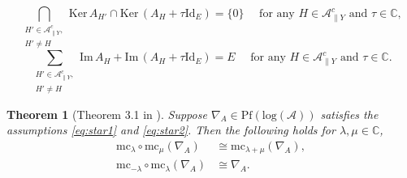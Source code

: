 \documentclass[a4paper,12pt]{article}
\newtheorem{thm}{Theorem}[section]
\theoremstyle{definition}
\theoremstyle{remark}
\begin{document}
\begin{equation}\label{eq:star1}
	\bigcap_{\substack{H'\in \mathcal{A}_{\parallel Y}^{c},\\H'\neq H}}\mathrm{Ker\,}A_{H'}\cap \mathrm{Ker\,} (A_{H}+\tau \mathrm{Id}_{E})=\{0\}
	\quad \text{ for any }H\in \mathcal{A}_{\parallel Y}^{c}\text{ and }\tau\in \mathbb{C},
\end{equation}
\begin{equation}\label{eq:star2}
	\sum_{\substack{H'\in \mathcal{A}_{\parallel Y}^{c},\\H'\neq H}}\mathrm{Im\,}A_{H} + \mathrm{Im\,}(A_{H}+\tau \mathrm{Id}_{E})=E
	\quad \text{ for any }H\in \mathcal{A}_{\parallel Y}^{c}\text{ and }\tau\in \mathbb{C}.
\end{equation}
\begin{thm}[Theorem 3.1 in \cite{Har1}]\label{thm:MCcompos}
Suppose $\nabla_{A}\in \mathrm{Pf}(\mathrm{log}(\mathcal{A}))$ satisfies the assumptions \eqref{eq:star1} and \eqref{eq:star2}.
Then
the following holds for $\lambda,\mu\in \mathbb{C}$,
\begin{align*}
	\mathrm{mc}_{\lambda}\circ \mathrm{mc}_{\mu}(\nabla_{A})
	&\cong \mathrm{mc}_{\lambda+\mu}(\nabla_{A}),\\
	\mathrm{mc}_{-\lambda}\circ \mathrm{mc}_{\lambda}(\nabla_{A})
	&\cong \nabla_{A}.
\end{align*}
\end{thm}
\end{document}
